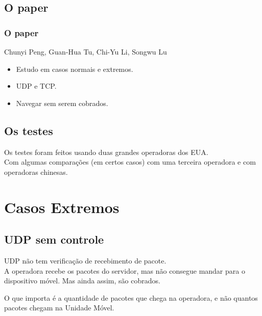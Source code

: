 \documentclass[brazil]{beamer}
\begin{document}
\subsection{O paper}
\begin{frame}[fragile]
    \frametitle{O paper}
    \begin{center}
        Chunyi Peng, Guan-Hua Tu, Chi-Yu Li, Songwu Lu
    \end{center}
    \vspace{0.4cm}
    \begin{itemize}
        \item Estudo em casos normais e extremos.
        \item UDP e TCP.
        \item Navegar sem serem cobrados.

    \end{itemize}
\end{frame}

\subsection{Os testes}
\begin{frame}[fragile]
    Os testes foram feitos usando duas grandes operadoras dos EUA. \\
    Com algumas comparações (em certos casos) com uma terceira operadora e com operadoras chinesas.
\end{frame}

\section{Casos Extremos}

\subsection{UDP sem controle}

\begin{frame}[fragile]
    UDP não tem verificação de recebimento de pacote. \\
    A operadora recebe os pacotes do servidor, mas não consegue mandar para o dispositivo móvel. Mas ainda assim, são cobrados.
\end{frame}

\begin{frame}[fragile]
    O que importa é a quantidade de pacotes que chega na operadora, e não quantos pacotes chegam na Unidade Móvel.
\end{frame}
\end{document}
